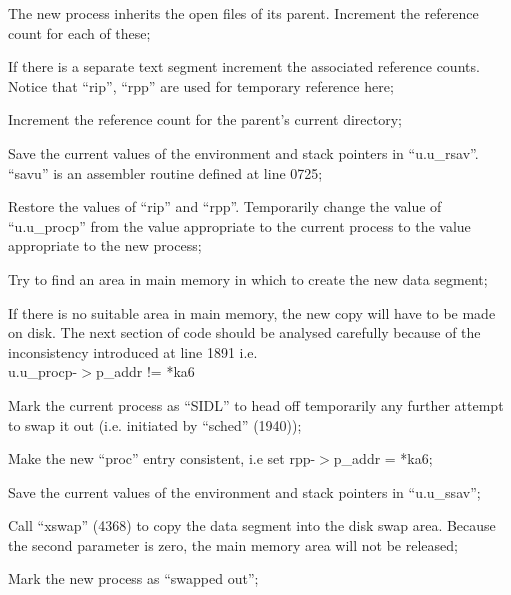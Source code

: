 \item[1876:] The new process inherits the open
files of its parent. Increment
the reference count for each of
these;

\item[1879:] If there is a separate text segment increment the associated
reference counts. Notice that
``rip'', ``rpp'' are used for temporary reference here;

\item[1883:] Increment the reference count for
the parent's current directory;

\item[1889:] Save the current values of the
 environment and stack pointers in
``u.u\_rsav''. ``savu'' is an assembler
routine defined at line 0725;

\item[1890:] Restore the values of ``rip'' and
``rpp''. Temporarily change the
value of ``u.u\_procp'' from the
value appropriate to the current
process to the value appropriate
to the new process;

\item[1896:] Try to find an area in main
 memory in which to create the new
 data segment;

\item[1902:] If there is no suitable area in
 main memory, the new copy will
have to be made on disk. The
next section of code should be
analysed carefully because of the
inconsistency introduced at line
1891 i.e.\\
u.u\_procp-$>$p\_addr != *ka6

\item[1903:] Mark the current process as
 ``SIDL'' to head off temporarily
 any further attempt to swap it
 out (i.e. initiated by ``sched''
 (1940));

\item[1904:] Make the new ``proc'' entry consistent,
i.e set rpp-$>$p\_addr = *ka6;

\item[1905:] Save the current values of the
 environment and stack pointers in
 ``u.u\_ssav'';

\item[1906:] Call ``xswap'' (4368) to copy the
 data segment into the disk swap
 area. Because the second parameter is zero, the main memory area
 will not be released;

\item[1907:] Mark the new process as ``swapped
 out'';


